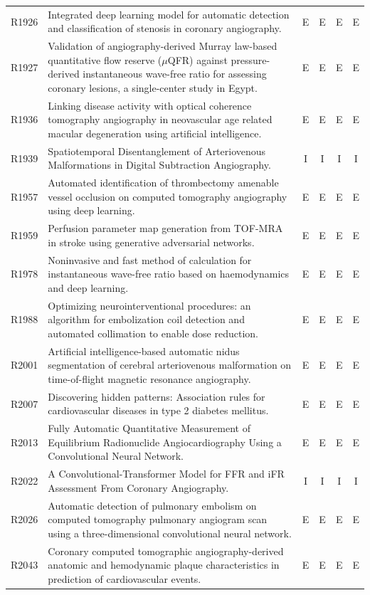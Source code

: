 \begin{longtable}{@{}l p{8.6cm} c c c c@{}}
R1926 & Integrated deep learning model for automatic detection and classification of stenosis in coronary angiography. & E & E & E & E \\
R1927 & Validation of angiography-derived Murray law-based quantitative flow reserve ($\mu$QFR) against pressure-derived instantaneous wave-free ratio for assessing coronary lesions, a single-center study in Egypt. & E & E & E & E \\
R1936 & Linking disease activity with optical coherence tomography angiography in neovascular age related macular degeneration using artificial intelligence. & E & E & E & E \\
R1939 & Spatiotemporal Disentanglement of Arteriovenous Malformations in Digital Subtraction Angiography. & I & I & I & I \\
R1957 & Automated identification of thrombectomy amenable vessel occlusion on computed tomography angiography using deep learning. & E & E & E & E \\
R1959 & Perfusion parameter map generation from TOF-MRA in stroke using generative adversarial networks. & E & E & E & E \\
R1978 & Noninvasive and fast method of calculation for instantaneous wave-free ratio based on haemodynamics and deep learning. & E & E & E & E \\
R1988 & Optimizing neurointerventional procedures: an algorithm for embolization coil detection and automated collimation to enable dose reduction. & E & E & E & E \\
R2001 & Artificial intelligence-based automatic nidus segmentation of cerebral arteriovenous malformation on time-of-flight magnetic resonance angiography. & E & E & E & E \\
R2007 & Discovering hidden patterns: Association rules for cardiovascular diseases in type 2 diabetes mellitus. & E & E & E & E \\
R2013 & Fully Automatic Quantitative Measurement of Equilibrium Radionuclide Angiocardiography Using a Convolutional Neural Network. & E & E & E & E \\
R2022 & A Convolutional-Transformer Model for FFR and iFR Assessment From Coronary Angiography. & I & I & I & I \\
R2026 & Automatic detection of pulmonary embolism on computed tomography pulmonary angiogram scan using a three-dimensional convolutional neural network. & E & E & E & E \\
R2043 & Coronary computed tomographic angiography-derived anatomic and hemodynamic plaque characteristics in prediction of cardiovascular events. & E & E & E & E \\

\end{longtable}
